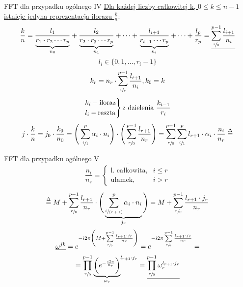 \begin{frame}{FFT dla przypadku ogólnego IV}
	\underline{Dla każdej liczby całkowitej k, $0 \leq k \leq n-1$} \\
	\underline{istnieje jedyna reprezentacja ilorazu $\frac{k}{n}$}:
	\[
		\frac{k}{n} = \frac{l_1}{\underbrace{r_1 \cdot r_2 \cdots r_p}_{n_0}} + \frac{l_2}{\underbrace{r_2 \cdot r_3 \cdots r_p}_{n_1}} + \cdots + \frac{l_{i+1}}{\underbrace{r_{i+1} \cdots r_p}_{n_i}} + \cdots + \frac{l_p}{r_p} = \underline{\sum\limits_{\sfrac{i}{0}}^{p-1} \frac{l_{i+1}}{n_i}}
	\]
	\[
		l_i \in \{0, 1, \dots, r_i - 1\}
	\]
	\[
		k_r = n_r \cdot \sum\limits_{\sfrac{i}{r}}^{p-1} \frac{l_{i+1}}{n_i}, k_0 = k
	\]
	\[
		\begin{rcases}
			k_i - \text{iloraz} \\
			l_i - \text{reszta}
		\end{rcases}
		\text{z dzielenia } \frac{k_{i-1}}{r_i}
	\]
	\[
		j \cdot \frac{k}{n} = j_0 \cdot \frac{k_0}{n_0} = \Bigg( \sum\limits_{\sfrac{i}{1}}^{p} \alpha_i \cdot n_i \Bigg) \cdot \Bigg( \sum\limits_{\sfrac{r}{0}}^{p-1} \frac{l_{r+1}}{n_r} \Bigg) = \sum\limits_{\sfrac{r}{0}}^{p-1} \sum\limits_{\sfrac{i}{1}}^{p} l_{r+1} \cdot \alpha_i \cdot \frac{n_i}{n_r} \stackrel{\Delta}{=}	
	\]
\end{frame}
\begin{frame}{FFT dla przypadku ogólnego V}
	\[
		\underline{\overline{\frac{n_i}{n_r} = 
		\begin{cases}
			\text{l. całkowita}, & i \leq r \\
			\text{ułamek}, & i > r
		\end{cases}}}
	\]
	\[
		\stackrel{\Delta}{=} M + \sum\limits_{\sfrac{r}{0}}^{p-1} \frac{l_{r+1}}{n_r} \cdot \Bigg( \underbrace{\sum\limits_{\sfrac{i}{(r+1)}}^{p} \alpha_i \cdot n_i}_{j_r} \Bigg) = M +  \sum\limits_{\sfrac{r}{0}}^{p-1} \frac{l_{r+1} \cdot j_r}{n_r}
	\]
	\[
		\underline{\omega^{jk}} = e^{-i2\pi \bigg( M +  \sum\limits_{\sfrac{r}{0}}^{p-1} \frac{l_{r+1} \cdot j_r}{n_r} \bigg)} = e^{-i2\pi \sum\limits_{\sfrac{r}{0}}^{p-1} \frac{l_{r+1} \cdot j_r}{n_r}} =
	\]
	\[
		= \prod\limits_{\sfrac{r}{0}}^{p-1} {\underbrace{\bigg( e^{-\frac{i2\pi}{n_r}} \bigg)}_{\omega_r}}^{l_{r+1} \cdot j_r} = \underline{\prod\limits_{\sfrac{r}{0}}^{p-1} \omega_r^{l_{r+1} \cdot j_r}}
	\]
\end{frame}
